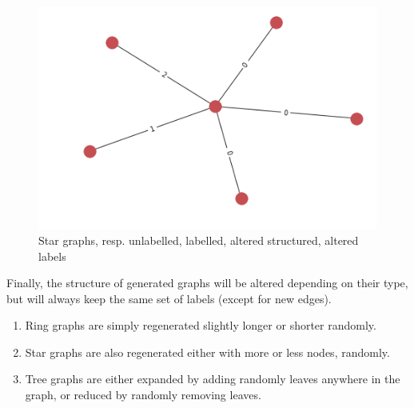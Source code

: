 \documentclass{article}
\theoremstyle{definition}
\begin{document}
\begin{figure}[!htb]
\begin{multicols}{4}
    \includegraphics[width=\linewidth]{data/generated-graphs/star_altered_labels.png}\par
\end{multicols}
\caption{Star graphs, resp. unlabelled, labelled, altered structured, altered labels}
\end{figure}
Finally, the structure of generated graphs will be altered depending on their type, but will always keep the same set of labels (except for new edges).
\begin{enumerate}
    \item Ring graphs are simply regenerated slightly longer or shorter randomly.
    \item Star graphs are also regenerated either with more or less nodes, randomly.
    \item Tree graphs are either expanded by adding randomly leaves anywhere in the graph, or reduced by randomly removing leaves.
\end{enumerate}
\end{document}
